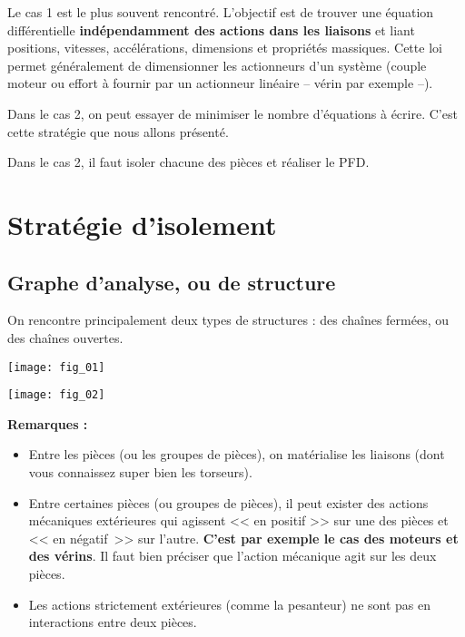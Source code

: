 Le cas 1 est le plus souvent rencontré. L'objectif est de trouver une équation différentielle \textbf{indépendamment des actions dans les liaisons} et liant positions, vitesses, accélérations, dimensions et propriétés massiques. 
Cette loi permet généralement de dimensionner les actionneurs d'un système (couple moteur ou effort à fournir par un actionneur linéaire -- vérin par exemple --).

Dans le cas 2, on peut essayer de minimiser le nombre d'équations à écrire. C'est cette stratégie que nous allons présenté.

Dans le cas 2, il faut isoler chacune des pièces et réaliser le PFD. 




\section{Stratégie d'isolement}

\subsection{Graphe d'analyse, ou de structure}

On rencontre principalement deux types de structures : des chaînes fermées, ou des chaînes ouvertes.

\begin{figure*}[!ht]
\begin{minipage}[c]{.4\linewidth}
\begin{center}
\texttt{[image: fig\_01]}
\end{center}
\end{minipage}
\hfill
\begin{minipage}[c]{.55\linewidth}
\begin{center}
\texttt{[image: fig\_02]}
\end{center}
\end{minipage}
\end{figure*}

\textbf{Remarques :}
\begin{itemize}
\item Entre les pièces (ou les groupes de pièces), on matérialise les liaisons (dont vous connaissez super bien les torseurs).
\item Entre certaines pièces (ou groupes de pièces), il peut exister des actions mécaniques extérieures qui agissent << en positif >> sur une des pièces et << en négatif~>> sur l'autre. \textbf{C'est par exemple le cas des moteurs et des vérins}. Il faut bien préciser que l'action mécanique agit sur les deux pièces.
\item Les actions strictement extérieures (comme la pesanteur) ne sont pas en interactions entre deux pièces.
\end{itemize}


